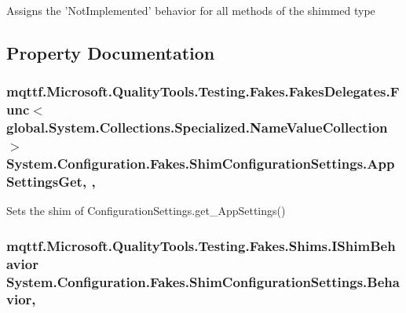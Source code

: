 Assigns the 'Not\-Implemented' behavior for all methods of the shimmed type



\subsection{Property Documentation}
\hypertarget{class_system_1_1_configuration_1_1_fakes_1_1_shim_configuration_settings_a4533b38e16dc3030ef2f6982415c8be8}{
\subsubsection[{App\-Settings\-Get}]{\setlength{\rightskip}{0pt plus 5cm}mqttf.\-Microsoft.\-Quality\-Tools.\-Testing.\-Fakes.\-Fakes\-Delegates.\-Func$<$global.\-System.\-Collections.\-Specialized.\-Name\-Value\-Collection$>$ System.\-Configuration.\-Fakes.\-Shim\-Configuration\-Settings.\-App\-Settings\-Get\hspace{0.3cm}{\ttfamily [static]}, {\ttfamily [get]}, {\ttfamily [set]}}}\label{class_system_1_1_configuration_1_1_fakes_1_1_shim_configuration_settings_a4533b38e16dc3030ef2f6982415c8be8}


Sets the shim of Configuration\-Settings.\-get\-\_\-\-App\-Settings()

\hypertarget{class_system_1_1_configuration_1_1_fakes_1_1_shim_configuration_settings_a4e604f8a7363d93b1a102774df96f486}{
\subsubsection[{Behavior}]{\setlength{\rightskip}{0pt plus 5cm}mqttf.\-Microsoft.\-Quality\-Tools.\-Testing.\-Fakes.\-Shims.\-I\-Shim\-Behavior System.\-Configuration.\-Fakes.\-Shim\-Configuration\-Settings.\-Behavior\hspace{0.3cm}{\ttfamily [static]}, {\ttfamily [set]}}}\label{class_system_1_1_configuration_1_1_fakes_1_1_shim_configuration_settings_a4e604f8a7363d93b1a102774df96f486}


